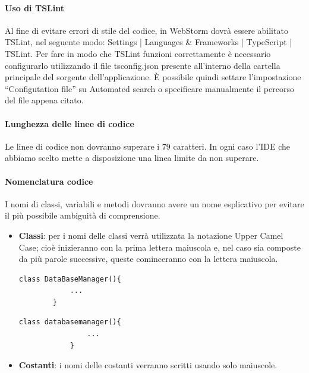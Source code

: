 \documentclass[11pt,a4paper]{article}
\begin{document}
{	\paragraph{Uso di TSLint}
	Al fine di evitare errori di stile del codice, in WebStorm dovrà essere abilitato TSLint, nel seguente modo: Settings | Languages \& Frameworks | TypeScript | TSLint.
	Per fare in modo che TSLint funzioni correttamente è necessario configurarlo utilizzando il file tsconfig.json presente all'interno della cartella principale del sorgente dell'applicazione. È possibile quindi settare l'impostazione ``Configutation file'' su Automated search o specificare manualmente il percorso del file appena citato.
	
	\paragraph{Lunghezza delle linee di codice} Le linee di codice non dovranno superare i 79 caratteri. In ogni caso l'IDE che abbiamo scelto mette a disposizione una linea limite da non superare.
	
	\paragraph{Nomenclatura codice}
	I nomi di classi, variabili e metodi dovranno avere un nome esplicativo per evitare il più possibile ambiguità di comprensione.
	\begin{itemize}
		\item \textbf{Classi}: per i nomi delle classi verrà utilizzata la notazione Upper Camel Case; cioè inizieranno con la prima lettera maiuscola e, nel caso sia composte da più parole successive, queste cominceranno con la lettera maiuscola.
	
		\begin{multicols}{2}
			
			\begin{lstlisting}[caption=Esempio Corretto]
		class DataBaseManager(){
			...
		}
			\end{lstlisting}
			
			\begin{lstlisting}[caption=Esempio Scorretto]
			class databasemanager(){
				...
			}
			\end{lstlisting}
		\end{multicols}
		
		\item \textbf{Costanti}: i nomi delle costanti verranno scritti usando solo maiuscole.
		

\end{itemize}}
\end{document}
